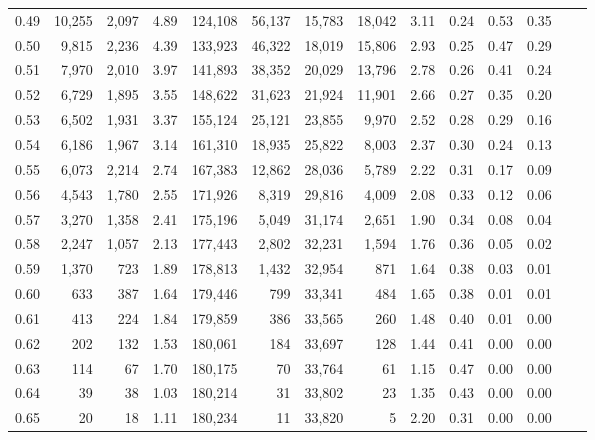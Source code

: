 \begin{tabular}{rrrrrrrrrrrrrr}
0.49 &  10,255 &  2,097 &    4.89 &  124,108 &   56,137 &  15,783 &  18,042 &  3.11 &  0.24 &  0.53 &      0.35 \\
0.50 &   9,815 &  2,236 &    4.39 &  133,923 &   46,322 &  18,019 &  15,806 &  2.93 &  0.25 &  0.47 &      0.29 \\
0.51 &   7,970 &  2,010 &    3.97 &  141,893 &   38,352 &  20,029 &  13,796 &  2.78 &  0.26 &  0.41 &      0.24 \\
0.52 &   6,729 &  1,895 &    3.55 &  148,622 &   31,623 &  21,924 &  11,901 &  2.66 &  0.27 &  0.35 &      0.20 \\
0.53 &   6,502 &  1,931 &    3.37 &  155,124 &   25,121 &  23,855 &   9,970 &  2.52 &  0.28 &  0.29 &      0.16 \\
0.54 &   6,186 &  1,967 &    3.14 &  161,310 &   18,935 &  25,822 &   8,003 &  2.37 &  0.30 &  0.24 &      0.13 \\
0.55 &   6,073 &  2,214 &    2.74 &  167,383 &   12,862 &  28,036 &   5,789 &  2.22 &  0.31 &  0.17 &      0.09 \\
0.56 &   4,543 &  1,780 &    2.55 &  171,926 &    8,319 &  29,816 &   4,009 &  2.08 &  0.33 &  0.12 &      0.06 \\
0.57 &   3,270 &  1,358 &    2.41 &  175,196 &    5,049 &  31,174 &   2,651 &  1.90 &  0.34 &  0.08 &      0.04 \\
0.58 &   2,247 &  1,057 &    2.13 &  177,443 &    2,802 &  32,231 &   1,594 &  1.76 &  0.36 &  0.05 &      0.02 \\
0.59 &   1,370 &    723 &    1.89 &  178,813 &    1,432 &  32,954 &     871 &  1.64 &  0.38 &  0.03 &      0.01 \\
0.60 &     633 &    387 &    1.64 &  179,446 &      799 &  33,341 &     484 &  1.65 &  0.38 &  0.01 &      0.01 \\
0.61 &     413 &    224 &    1.84 &  179,859 &      386 &  33,565 &     260 &  1.48 &  0.40 &  0.01 &      0.00 \\
0.62 &     202 &    132 &    1.53 &  180,061 &      184 &  33,697 &     128 &  1.44 &  0.41 &  0.00 &      0.00 \\
0.63 &     114 &     67 &    1.70 &  180,175 &       70 &  33,764 &      61 &  1.15 &  0.47 &  0.00 &      0.00 \\
0.64 &      39 &     38 &    1.03 &  180,214 &       31 &  33,802 &      23 &  1.35 &  0.43 &  0.00 &      0.00 \\
0.65 &      20 &     18 &    1.11 &  180,234 &       11 &  33,820 &       5 &  2.20 &  0.31 &  0.00 &      0.00 \\

\end{tabular}

